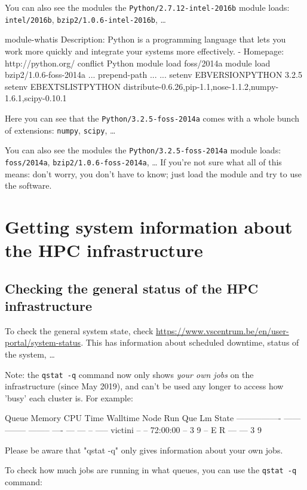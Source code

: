 You can also see the modules the \lstinline|Python/2.7.12-intel-2016b| module loads:
\lstinline|intel/2016b|, \lstinline|bzip2/1.0.6-intel-2016b|, \ldots

\else
\begin{prompt}
module-whatis	 Description: Python is a programming language that lets you work more quickly and integrate your systems more effectively. - Homepage: http://python.org/
conflict	 Python
module		 load foss/2014a
module		 load bzip2/1.0.6-foss-2014a
...
prepend-path ...
...
setenv		 EBVERSIONPYTHON 3.2.5
setenv		 EBEXTSLISTPYTHON distribute-0.6.26,pip-1.1,nose-1.1.2,numpy-1.6.1,scipy-0.10.1

\end{prompt}

Here you can see that the \lstinline|Python/3.2.5-foss-2014a| comes with a whole
bunch of extensions: \lstinline|numpy|, \lstinline|scipy|, \ldots

You can also see the modules the \lstinline|Python/3.2.5-foss-2014a| module loads:
\lstinline|foss/2014a|, \lstinline|bzip2/1.0.6-foss-2014a|, \ldots
\fi
If you're not sure what all of this means: don't worry, you don't have to know;
just load the module and try to use the software.

\section{Getting system information about the HPC infrastructure}

\subsection{Checking the general status of the HPC infrastructure}

To check the general system state, check \url{https://www.vscentrum.be/en/user-portal/system-status}.
This has information about scheduled downtime, status of the system, \ldots

\ifgent
Note: the \lstinline|qstat -q| command now only shows \emph{your own jobs} on the
\hpcInfra infrastructure (since May 2019),
and can't be used any longer to access how 'busy' each cluster is. For example:

\begin{prompt}
Queue            Memory CPU Time Walltime Node  Run Que Lm State
---------------- ------ -------- -------- ----  --- --- -- -----
victini            --      --    72:00:00  --    3   9  --  E R
                                                --- ---
                                                 3   9

Please be aware that "qstat -q" only gives information about your own jobs.
\end{prompt}
\else
To check how much jobs are running in what queues, you can use the \lstinline|qstat -q|
command:

